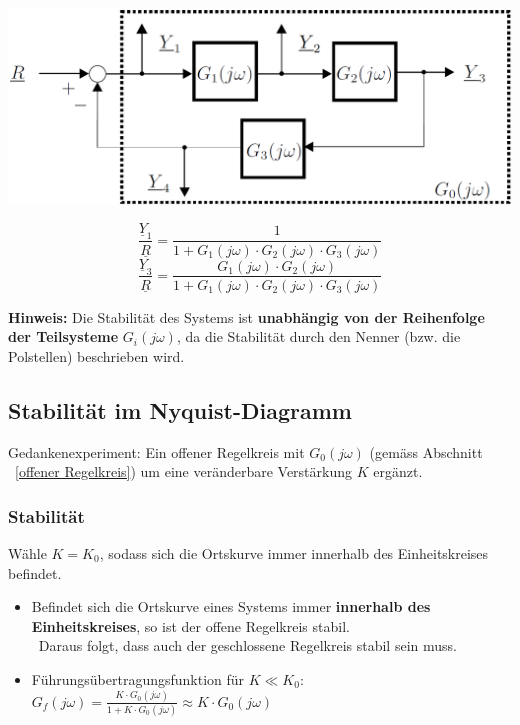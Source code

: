 \begin{minipage}[c]{0.5\columnwidth}
    \includegraphics[width=\columnwidth]{images/kreisschaltung_mehrere_bloecke.png}
\end{minipage}
\hfill
\begin{minipage}[c]{0.48\columnwidth}
    $$ \frac{\underline{Y}_1}{\underline{R}} = \frac{1}{1 + G_1(j \omega) \cdot G_2(j \omega) \cdot G_3(j \omega)} $$
    $$ \frac{\underline{Y}_3}{\underline{R}} = \frac{G_1(j \omega) \cdot G_2(j \omega)}{1 + G_1(j \omega) \cdot G_2(j \omega) \cdot G_3(j \omega)} $$
\end{minipage}

\vspace{0.2cm}
\textbf{Hinweis:} Die Stabilität des Systems ist \textbf{unabhängig von der Reihenfolge der Teilsysteme} $G_{i}(j \omega)$,
da die Stabilität durch den Nenner (bzw. die Polstellen) beschrieben wird.


\subsection{Stabilität im Nyquist-Diagramm}

Gedankenexperiment: Ein offener Regelkreis mit $G_0(j \omega)$ (gemäss Abschnitt ~\ref{offener Regelkreis}) um eine 
veränderbare Verstärkung $K$ ergänzt.


\subsubsection{Stabilität}

Wähle $K = K_0$, sodass sich die Ortskurve immer innerhalb des Einheitskreises befindet.
\vspace{0.1cm}
\begin{itemize}
    \item Befindet sich die Ortskurve eines Systems immer \textbf{innerhalb des Einheitskreises}, so ist der offene Regelkreis stabil. \\
        \textrightarrow\ Daraus folgt, dass auch der geschlossene Regelkreis stabil sein muss.
    \item Führungsübertragungsfunktion für $K \ll K_0$:\\
    $G_f(j \omega) = \frac{K \cdot G_0(j \omega)}{1 + K \cdot G_0(j \omega)} \approx K \cdot G_0(j \omega)$ 
\end{itemize}


